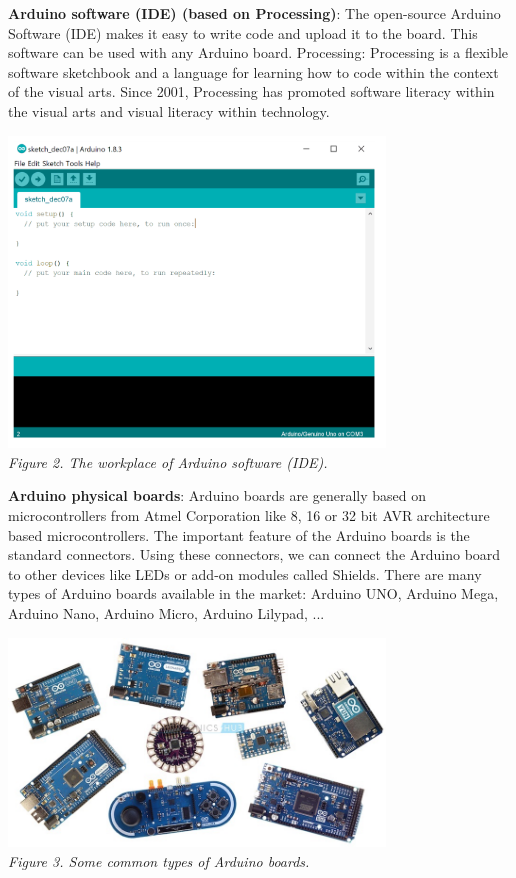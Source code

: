 \documentclass[a4paper]{article}
\begin{document}
\textbf{Arduino software (IDE) (based on Processing)}: The open-source Arduino Software (IDE) makes it easy to write code and upload it to the board. This software can be used with any Arduino board.
Processing: Processing is a flexible software sketchbook and a language for learning how to code within the context of the visual arts. Since 2001, Processing has promoted software literacy within the visual arts and visual literacy within technology.
\medskip
\begin{center}
    \includegraphics[width=10cm]{pictures/2.png}\\
    \textit{Figure 2. The workplace of Arduino software (IDE).}\\
\end{center}
\medskip
\textbf{Arduino physical boards}: Arduino boards are generally based on microcontrollers from Atmel Corporation like 8, 16 or 32 bit AVR architecture based microcontrollers. The important feature of the Arduino boards is the standard connectors. Using these connectors, we can connect the Arduino board to other devices like LEDs or add-on modules called Shields. There are many types of Arduino boards available in the market: Arduino UNO, Arduino Mega, Arduino Nano, Arduino Micro, Arduino Lilypad, ...
\medskip
\begin{center}
    \includegraphics[width=10cm]{pictures/3.jpg}\\
    \textit{Figure 3. Some common types of Arduino boards.}\\
\end{center}
\end{document}
